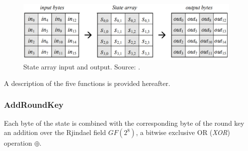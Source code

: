 \begin{figure}
\includegraphics[width = \textwidth]{../Figures/FISP_AES/state.png} 
\caption[State array input and output.]{State array input and output. Source: \cite{nist197}.}\label{fig:AES_state}
\end{figure}

A description of the five functions is provided hereafter.


\subsubsection*{AddRoundKey} Each byte of the state is combined with the corresponding byte of the round key \via an addition over the Rjindael field $GF(2^8)$, \ie a bitwise exclusive OR (\emph{XOR}) operation $\oplus$.
